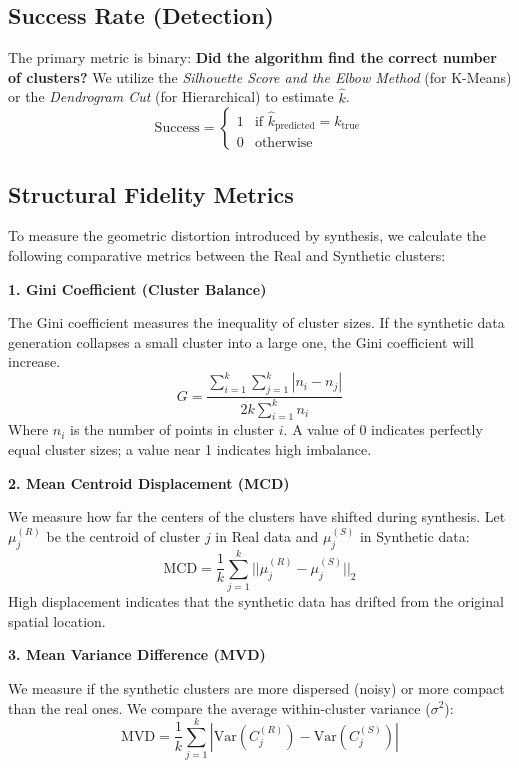 \subsection{Success Rate (Detection)}
The primary metric is binary: \textbf{Did the algorithm find the correct number of clusters?} We utilize the \textit{Silhouette Score and the Elbow Method} (for K-Means) \cite{rousseeuw1987} or the \textit{Dendrogram Cut} (for Hierarchical) to estimate $\hat{k}$.
\begin{equation}
  \text{Success} =
  \begin{cases}
    1 & \text{if } \hat{k}_{\text{predicted}} = k_{\text{true}} \\
    0 & \text{otherwise}
  \end{cases}
\end{equation}

\subsection{Structural Fidelity Metrics}
To measure the geometric distortion introduced by synthesis, we calculate the following comparative metrics between the Real and Synthetic clusters:

\textbf{1. Gini Coefficient (Cluster Balance)}

The Gini coefficient measures the inequality of cluster sizes. If the synthetic data generation collapses a small cluster into a large one, the Gini coefficient will increase.
\begin{equation}
  G = \frac{\sum_{i=1}^{k} \sum_{j=1}^{k} |n_i - n_j|}{2k \sum_{i=1}^{k} n_i}
\end{equation}
Where $n_i$ is the number of points in cluster $i$. A value of 0 indicates perfectly equal cluster sizes; a value near 1 indicates high imbalance.

\textbf{2. Mean Centroid Displacement (MCD)}

We measure how far the centers of the clusters have shifted during synthesis. Let $\mu_j^{(R)}$ be the centroid of cluster $j$ in Real data and $\mu_j^{(S)}$ in Synthetic data:
\begin{equation}
  \text{MCD} = \frac{1}{k} \sum_{j=1}^{k} ||\mu_j^{(R)} - \mu_j^{(S)}||_2
\end{equation}
High displacement indicates that the synthetic data has drifted from the original spatial location.

\textbf{3. Mean Variance Difference (MVD)}

We measure if the synthetic clusters are more dispersed (noisy) or more compact than the real ones. We compare the average within-cluster variance ($\sigma^2$):
\begin{equation}
  \text{MVD} = \frac{1}{k} \sum_{j=1}^{k} \left| \text{Var}(C_j^{(R)}) - \text{Var}(C_j^{(S)}) \right|
\end{equation}
